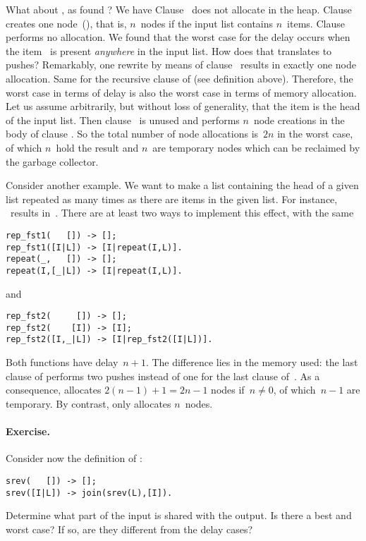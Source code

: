 What about , as found
? We have 
Clause~\clause{\alpha} does not allocate in the
heap. Clause~\clause{\gamma} creates one node~(\erlcode{|}), that is,
\(n\)~nodes if the input list contains
\(n\)~items. Clause~\clause{\beta} performs no allocation. We found
that the worst case for the delay occurs when the item~ is
present \emph{anywhere} in the input list. How does that translates to
pushes?  Remarkably, one rewrite by means of clause~\clause{\zeta}
results in exactly one node allocation. Same for the recursive clause
of  (see definition above). Therefore, the worst
case in terms of delay is also the worst case in terms of memory
allocation. Let us assume arbitrarily, but without loss of generality,
that the item is the head of the input list. Then
clause~\clause{\zeta} is unused and  performs
\(n\)~node creations in the body of clause \clause{\epsilon}. So the
total number of node allocations is~\(2n\) in the worst case, of which
\(n\)~hold the result and \(n\)~are temporary nodes which can be
reclaimed by the garbage collector.

Consider another example. We want to make a list containing the head
of a given list repeated as many times as there are items in the given
list. For instance, \erlcode{[b,3,1]}~results
in~\erlcode{[b,b,b]}. There are at least two ways to implement this
effect, with the same
\begin{verbatim}
rep_fst1(   []) -> [];
rep_fst1([I|L]) -> [I|repeat(I,L)].
repeat(_,   []) -> [];
repeat(I,[_|L]) -> [I|repeat(I,L)].
\end{verbatim}
and
\begin{verbatim}
rep_fst2(     []) -> [];
rep_fst2(    [I]) -> [I];
rep_fst2([I,_|L]) -> [I|rep_fst2([I|L])].
\end{verbatim}
Both functions have delay~\(n+1\). The difference lies in the memory
used: the last clause of  performs two pushes
instead of one for the last clause of~. As a
consequence,  allocates \(2(n-1)+1=2n-1\) nodes
if~\(n \neq 0\), of which~\(n-1\) are temporary. By contrast,
 only allocates \(n\)~nodes.

\medskip

\paragraph{Exercise.}
\label{ex:aliasing_and_tail-call_optimisation}


Consider now the definition of :
\begin{verbatim}
srev(   []) -> [];
srev([I|L]) -> join(srev(L),[I]).
\end{verbatim}
Determine what part of the input is shared with the output. Is there a
best and worst case? If so, are they different from the delay cases?

